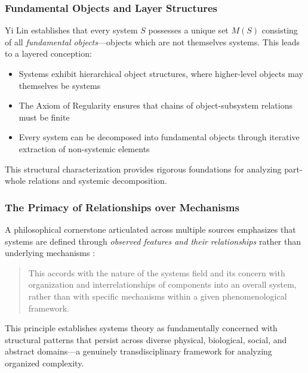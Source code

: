 \subsubsection{Fundamental Objects and Layer Structures}

Yi Lin \citep{Lin1999} establishes that every system $S$ possesses a unique set $M(S)$ consisting of all \emph{fundamental objects}---objects which are not themselves systems. This leads to a layered conception:

\begin{itemize}
\item Systems exhibit hierarchical object structures, where higher-level objects may themselves be systems
\item The Axiom of Regularity ensures that chains of object-subsystem relations must be finite
\item Every system can be decomposed into fundamental objects through iterative extraction of non-systemic elements
\end{itemize}

This structural characterization provides rigorous foundations for analyzing part-whole relations and systemic decomposition.

\subsubsection{The Primacy of Relationships over Mechanisms}

A philosophical cornerstone articulated across multiple sources emphasizes that systems are defined through \emph{observed features and their relationships} rather than underlying mechanisms \citep{Mesarovic1975}:

\begin{quote}
This accords with the nature of the systems field and its concern with organization and interrelationships of components into an overall system, rather than with specific mechanisms within a given phenomenological framework.
\end{quote}

This principle establishes systems theory as fundamentally concerned with structural patterns that persist across diverse physical, biological, social, and abstract domains---a genuinely transdisciplinary framework for analyzing organized complexity.